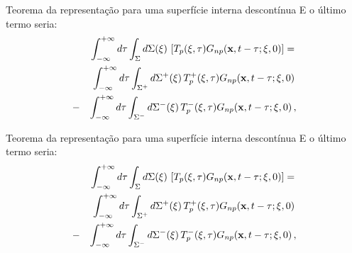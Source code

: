 \documentclass{beamer}
\newcommand{\xvec}{\mathbf{x}}
\newcommand{\xivec}{\boldmath \xi}
\begin{document}
\begin{frame}{Teorema da representa\c{c}\~ao para uma superf\'icie interna descont\'inua}
E o último termo seria:
\begin{eqnarray*}  
	& & \int_{-\infty }^{+\infty}d\tau\int_{\Sigma}d\Sigma(\xivec)\, \left[ T_{p}(\xivec,\tau) G_{np}(\xvec,t-\tau;\xivec,0) \right] =  \, \\
	& & \int_{-\infty }^{+\infty}d\tau\int_{\Sigma^{+}}d\Sigma^{+}(\xivec)\,  T^{+}_{p}(\xivec,\tau) G_{np}(\xvec,t-\tau;\xivec,0)\, \\
	&-& \int_{-\infty }^{+\infty}d\tau\int_{\Sigma^{-}}d\Sigma^{-}(\xivec)\, T^{-}_{p}(\xivec,\tau)G_{np}(\xvec,t-\tau;\xivec,0) \, ,   
\end{eqnarray*}
\end{frame}

\begin{frame}{Teorema da representa\c{c}\~ao para uma superf\'icie interna descont\'inua}
	E o último termo seria:
	\begin{eqnarray*}  
		& & \int_{-\infty }^{+\infty}d\tau\int_{\Sigma}d\Sigma(\xivec)\, \left[ T_{p}(\xivec,\tau) G_{np}(\xvec,t-\tau;\xivec,0) \right] =  \, \\
		& & \int_{-\infty }^{+\infty}d\tau\int_{\Sigma^{+}}d\Sigma^{+}(\xivec)\,  T^{+}_{p}(\xivec,\tau) G_{np}(\xvec,t-\tau;\xivec,0)\, \\
		&-& \int_{-\infty }^{+\infty}d\tau\int_{\Sigma^{-}}d\Sigma^{-}(\xivec)\, T^{-}_{p}(\xivec,\tau)G_{np}(\xvec,t-\tau;\xivec,0) \, ,   
	\end{eqnarray*}
\end{frame}
\end{document}
